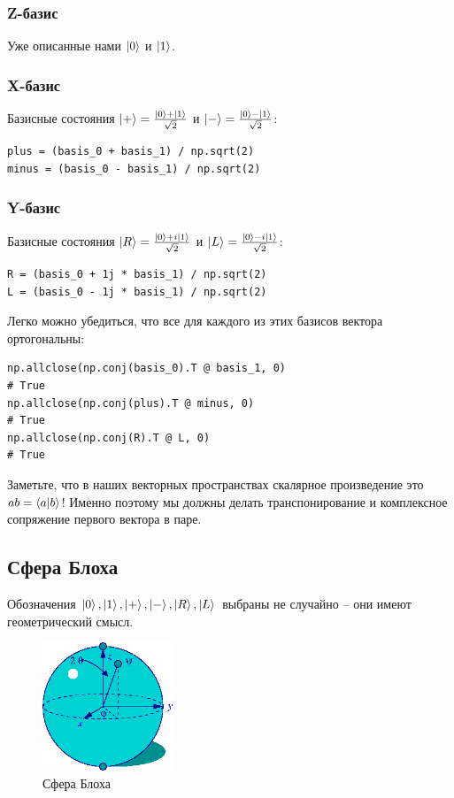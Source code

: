 \documentclass[11pt]{article}
\begin{document}
\subsubsection{Z-базис}
\label{sec:org40159e3}
Уже описанные нами \(\ket{0}\) и \(\ket{1}\).

\subsubsection{X-базис}
\label{sec:org5802603}
Базисные состояния \(\ket{+} = \frac{\ket{0} + \ket{1}}{\sqrt{2}}\) и \(\ket{-} = \frac{\ket{0} - \ket{1}}{\sqrt{2}}\):
\begin{verbatim}
plus = (basis_0 + basis_1) / np.sqrt(2)
minus = (basis_0 - basis_1) / np.sqrt(2)
\end{verbatim}

\subsubsection{Y-базис}
\label{sec:org473ee1e}
Базисные состояния \(\ket{R} = \frac{\ket{0} + i\ket{1}}{\sqrt{2}}\) и \(\ket{L} = \frac{\ket{0} - i\ket{1}}{\sqrt{2}}\):
\begin{verbatim}
R = (basis_0 + 1j * basis_1) / np.sqrt(2)
L = (basis_0 - 1j * basis_1) / np.sqrt(2)
\end{verbatim}

Легко можно убедиться, что все для каждого из этих базисов вектора ортогональны:
\begin{verbatim}
np.allclose(np.conj(basis_0).T @ basis_1, 0)
# True
np.allclose(np.conj(plus).T @ minus, 0)
# True
np.allclose(np.conj(R).T @ L, 0)
# True
\end{verbatim}

Заметьте, что в наших векторных пространствах скалярное произведение это \(ab = \bra{a}\ket{b}\)! Именно поэтому мы должны делать транспонирование и комплексное сопряжение первого вектора в паре.

\subsection{Сфера Блоха}
\label{sec:orga35a297}
Обозначения \(\ket{0}, \ket{1}, \ket{+}, \ket{-}, \ket{R}, \ket{L}\) выбраны не случайно -- они имеют геометрический смысл.

\begin{center}
\begin{figure}[htbp]
\centering
\includegraphics[width=0.35\textwidth]{./images/Blochcolor-alt.png}
\caption{Сфера Блоха}
\end{figure}
\end{center}
\end{document}
